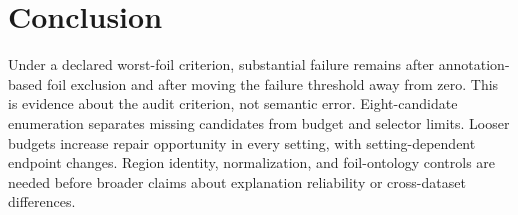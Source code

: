 \documentclass[10pt]{article}
\begin{document}
\section{Conclusion}
Under a declared worst-foil criterion, substantial failure remains after
annotation-based foil exclusion and after moving the failure threshold away
from zero. This is evidence about the audit criterion, not semantic error.
Eight-candidate enumeration separates missing candidates from budget and
selector limits. Looser budgets increase repair opportunity in every setting,
with setting-dependent endpoint changes. Region identity, normalization,
and foil-ontology controls are needed before broader claims about explanation
reliability or cross-dataset differences.

\clearpage

\end{document}

